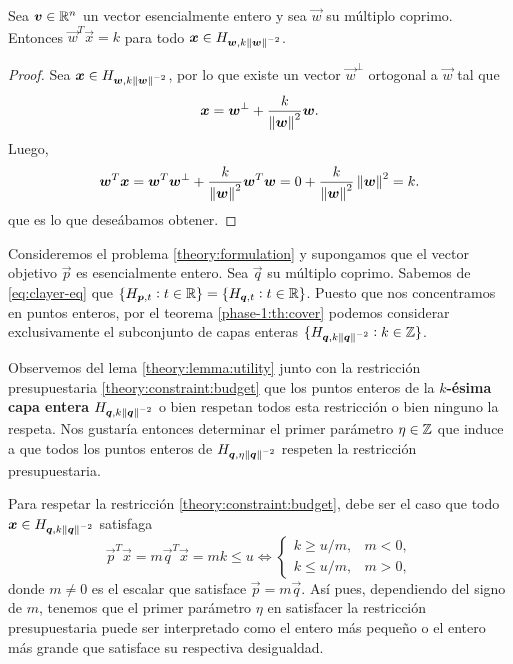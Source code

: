 \begin{lemma}
	\label{theory:lemma:utility}
	Sea $\boldsymbol{v} \in \mathbb{R}^n$ un vector esencialmente entero y sea $\vec{w}$ su múltiplo coprimo.
	Entonces $\vec{w}^T\vec{x} = k$ para todo $\boldsymbol{x} \in H_{\boldsymbol{w}, k\left\lVert \boldsymbol{w} \right\rVert^{-2}}$.
\end{lemma}
\begin{proof}
	Sea $\boldsymbol{x} \in H_{\boldsymbol{w}, k\left\lVert \boldsymbol{w} \right\rVert^{-2}}$, por lo que existe un vector $\vec{w}^\perp$ ortogonal a
	$\vec{w}$ tal que
	\begin{equation*}
		\boldsymbol{x} = \boldsymbol{w}^\perp + \frac{k}{\left\lVert \boldsymbol{w} \right\rVert^2}\boldsymbol{w}.
	\end{equation*}
	Luego,
	\begin{equation*}
		\boldsymbol{w}^T\boldsymbol{x} = \boldsymbol{w}^T\boldsymbol{w}^\perp + \frac{k}{\left\lVert \boldsymbol{w} \right\rVert^2}\boldsymbol{w}^T\boldsymbol{w}
		=
		0 + \frac{k}{\left\lVert \boldsymbol{w} \right\rVert^2}\left\lVert \boldsymbol{w} \right\rVert^2 = k.
	\end{equation*}
	que es lo que deseábamos obtener.
\end{proof}


Consideremos el problema \eqref{theory:formulation} y supongamos que el vector objetivo $\vec{p}$ es
esencialmente entero. Sea $\vec{q}$ su múltiplo coprimo. Sabemos de \eqref{eq:clayer-eq} que 
	$\lbrace H_{\boldsymbol{p}, t} \vcentcolon t \in \mathbb{R} \rbrace
	=
	\lbrace H_{\boldsymbol{q}, t} \vcentcolon t \in \mathbb{R} \rbrace$.
Puesto que nos concentramos en puntos enteros, por el teorema \ref{phase-1:th:cover} podemos
considerar exclusivamente el subconjunto de capas enteras $\lbrace H_{\boldsymbol{q}, k\left\lVert \boldsymbol{q} \right\rVert^{-2}} \vcentcolon k \in
\mathbb{Z} \rbrace$.

Observemos del lema \ref{theory:lemma:utility} junto con la restricción presupuestaria
\eqref{theory:constraint:budget} que los puntos enteros de la \textbf{$k$-ésima capa entera}
$H_{\boldsymbol{q}, k\left\lVert \boldsymbol{q} \right\rVert^{-2}}$ o bien respetan todos esta restricción o bien ninguno la respeta. Nos gustaría
entonces determinar el primer parámetro $\eta \in \mathbb{Z}$ que induce a que todos los puntos enteros de
$H_{\boldsymbol{q}, \eta\left\lVert \boldsymbol{q} \right\rVert^{-2}}$ respeten la restricción presupuestaria.

Para respetar la restricción \eqref{theory:constraint:budget}, debe ser el caso que
todo $\boldsymbol{x} \in H_{\boldsymbol{q}, k\left\lVert \boldsymbol{q} \right\rVert^{-2}}$ satisfaga
\begin{equation}
	\label{eq:eta-cases}
	\vec{p}^T\vec{x} = m\vec{q}^T\vec{x} = mk \leq u
	\iff
	\begin{cases}
		k \geq u/m, & m < 0, \\
		k \leq u/m, & m > 0,
	\end{cases}
\end{equation}
donde $m \neq 0$ es el escalar que satisface $\vec{p} = m\vec{q}$. Así pues, dependiendo del signo
de $m$, tenemos que el primer parámetro $\eta$ en satisfacer la restricción presupuestaria puede ser
interpretado como el entero más pequeño o el entero más grande que satisface su respectiva
desigualdad.

